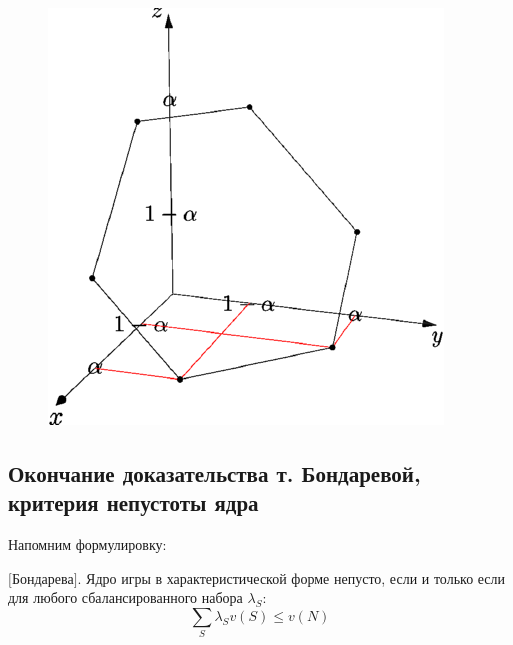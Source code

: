 \begin{figure}[htbp]
   \includegraphics{coop_3player.pdf}
\end{figure}




\subsection{Окончание доказательства т. Бондаревой, критерия непустоты ядра}

Напомним формулировку:
\begin{myth} $[$Бондарева$]$.
Ядро игры в характеристической форме непусто, если и только если для любого сбалансированного набора $\lambda_{S}$:
\begin{equation}
\label{balanced_game2}
\sum_{S} \lambda_{S}v(S)\leq v(N)
\end{equation}
\end{myth}

